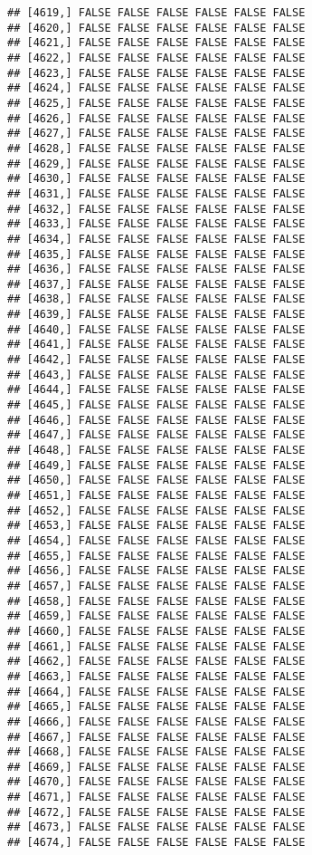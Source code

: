 \documentclass[
]{article}
\begin{document}
\begin{verbatim}
## [4619,] FALSE FALSE FALSE FALSE FALSE FALSE
## [4620,] FALSE FALSE FALSE FALSE FALSE FALSE
## [4621,] FALSE FALSE FALSE FALSE FALSE FALSE
## [4622,] FALSE FALSE FALSE FALSE FALSE FALSE
## [4623,] FALSE FALSE FALSE FALSE FALSE FALSE
## [4624,] FALSE FALSE FALSE FALSE FALSE FALSE
## [4625,] FALSE FALSE FALSE FALSE FALSE FALSE
## [4626,] FALSE FALSE FALSE FALSE FALSE FALSE
## [4627,] FALSE FALSE FALSE FALSE FALSE FALSE
## [4628,] FALSE FALSE FALSE FALSE FALSE FALSE
## [4629,] FALSE FALSE FALSE FALSE FALSE FALSE
## [4630,] FALSE FALSE FALSE FALSE FALSE FALSE
## [4631,] FALSE FALSE FALSE FALSE FALSE FALSE
## [4632,] FALSE FALSE FALSE FALSE FALSE FALSE
## [4633,] FALSE FALSE FALSE FALSE FALSE FALSE
## [4634,] FALSE FALSE FALSE FALSE FALSE FALSE
## [4635,] FALSE FALSE FALSE FALSE FALSE FALSE
## [4636,] FALSE FALSE FALSE FALSE FALSE FALSE
## [4637,] FALSE FALSE FALSE FALSE FALSE FALSE
## [4638,] FALSE FALSE FALSE FALSE FALSE FALSE
## [4639,] FALSE FALSE FALSE FALSE FALSE FALSE
## [4640,] FALSE FALSE FALSE FALSE FALSE FALSE
## [4641,] FALSE FALSE FALSE FALSE FALSE FALSE
## [4642,] FALSE FALSE FALSE FALSE FALSE FALSE
## [4643,] FALSE FALSE FALSE FALSE FALSE FALSE
## [4644,] FALSE FALSE FALSE FALSE FALSE FALSE
## [4645,] FALSE FALSE FALSE FALSE FALSE FALSE
## [4646,] FALSE FALSE FALSE FALSE FALSE FALSE
## [4647,] FALSE FALSE FALSE FALSE FALSE FALSE
## [4648,] FALSE FALSE FALSE FALSE FALSE FALSE
## [4649,] FALSE FALSE FALSE FALSE FALSE FALSE
## [4650,] FALSE FALSE FALSE FALSE FALSE FALSE
## [4651,] FALSE FALSE FALSE FALSE FALSE FALSE
## [4652,] FALSE FALSE FALSE FALSE FALSE FALSE
## [4653,] FALSE FALSE FALSE FALSE FALSE FALSE
## [4654,] FALSE FALSE FALSE FALSE FALSE FALSE
## [4655,] FALSE FALSE FALSE FALSE FALSE FALSE
## [4656,] FALSE FALSE FALSE FALSE FALSE FALSE
## [4657,] FALSE FALSE FALSE FALSE FALSE FALSE
## [4658,] FALSE FALSE FALSE FALSE FALSE FALSE
## [4659,] FALSE FALSE FALSE FALSE FALSE FALSE
## [4660,] FALSE FALSE FALSE FALSE FALSE FALSE
## [4661,] FALSE FALSE FALSE FALSE FALSE FALSE
## [4662,] FALSE FALSE FALSE FALSE FALSE FALSE
## [4663,] FALSE FALSE FALSE FALSE FALSE FALSE
## [4664,] FALSE FALSE FALSE FALSE FALSE FALSE
## [4665,] FALSE FALSE FALSE FALSE FALSE FALSE
## [4666,] FALSE FALSE FALSE FALSE FALSE FALSE
## [4667,] FALSE FALSE FALSE FALSE FALSE FALSE
## [4668,] FALSE FALSE FALSE FALSE FALSE FALSE
## [4669,] FALSE FALSE FALSE FALSE FALSE FALSE
## [4670,] FALSE FALSE FALSE FALSE FALSE FALSE
## [4671,] FALSE FALSE FALSE FALSE FALSE FALSE
## [4672,] FALSE FALSE FALSE FALSE FALSE FALSE
## [4673,] FALSE FALSE FALSE FALSE FALSE FALSE
## [4674,] FALSE FALSE FALSE FALSE FALSE FALSE

\end{verbatim}
\end{document}

